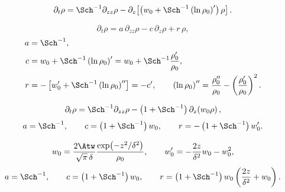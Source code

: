 
\begin{equation}
  \partial_t\rho
  =
  \Sch^{-1}\partial_{zz}\rho
  -
  \partial_z\!\left[
    \left(w_0+\Sch^{-1}\left(\ln\rho_0\right)'\right)\rho
  \right].
\end{equation}

\begin{equation}
  \partial_t\rho
  =
  a\,\partial_{zz}\rho
  -
  c\,\partial_z\rho
  +
  r\,\rho,
\end{equation}
\begin{subequations}
\begin{align}
  a &= \Sch^{-1}, \\
  c &= w_0+\Sch^{-1}\left(\ln\rho_0\right)'
     = w_0+\Sch^{-1}\frac{\rho_0'}{\rho_0}, \\
  r &= -\left[w_0'+\Sch^{-1}\left(\ln\rho_0\right)''\right]
     = -c',
  \qquad
  \left(\ln\rho_0\right)''
  =
  \frac{\rho_0''}{\rho_0}-\left(\frac{\rho_0'}{\rho_0}\right)^{2}.
\end{align}
\end{subequations}

\begin{equation}
  \partial_t\rho
  =
  \Sch^{-1}\partial_{zz}\rho
  -
  \left(1+\Sch^{-1}\right)\partial_z\!\left(w_0\rho\right),
\end{equation}
\begin{equation}
  a=\Sch^{-1},
  \qquad
  c=\left(1+\Sch^{-1}\right)w_0,
  \qquad
  r=-\left(1+\Sch^{-1}\right)w_0'.
\end{equation}

\begin{equation}
  w_0
  =
  \frac{2\Atw}{\sqrt{\pi}\,\delta}
  \frac{\exp\!\left(-z^{2}/\delta^{2}\right)}{\rho_0},
  \qquad
  w_0'
  =
  -\frac{2z}{\delta^{2}}w_0-w_0^{2},
\end{equation}
\begin{equation}
  a=\Sch^{-1},
  \qquad
  c=\left(1+\Sch^{-1}\right)w_0,
  \qquad
  r=\left(1+\Sch^{-1}\right)w_0\left(\frac{2z}{\delta^{2}}+w_0\right).
\end{equation}
